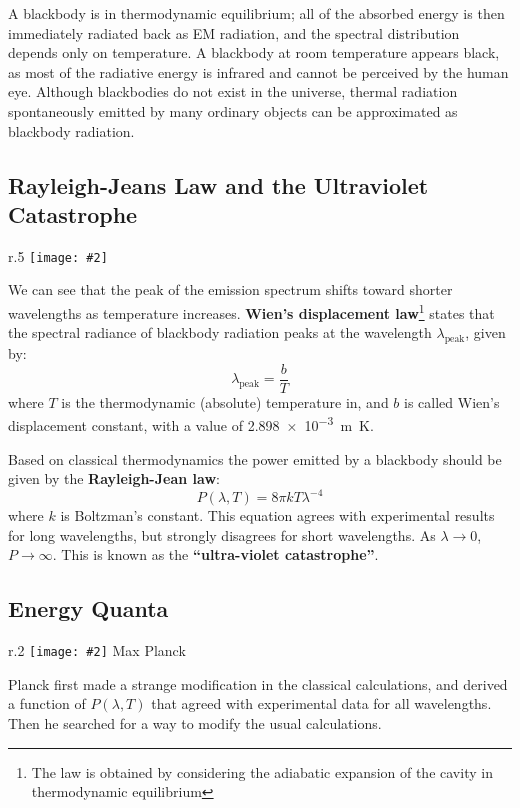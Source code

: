 \documentclass[11pt]{article}
\newcommand{\pic}[2]{\texttt{[image: \#2]}}
\begin{document}
A blackbody is in thermodynamic equilibrium; all of the absorbed energy is then
immediately radiated back as EM radiation, and the spectral distribution
depends only on temperature. A blackbody at room temperature appears black, as
most of the radiative energy is infrared and cannot be perceived by the human
eye. Although blackbodies do not exist in the universe, thermal radiation
spontaneously emitted by many ordinary objects can be approximated as blackbody
radiation.



\subsection{Rayleigh-Jeans Law and the Ultraviolet Catastrophe}

\begin{wrapfigure}{r}{.5\textwidth}
  \centering
  \pic{.5}{../1280px-Black_body}
\end{wrapfigure}
We can see that the peak of the emission spectrum shifts toward shorter
wavelengths as temperature increases.
\textbf{Wien's displacement law}\footnote{The law is obtained by
  considering the adiabatic expansion of the cavity in thermodynamic
  equilibrium} states that the spectral radiance of blackbody radiation peaks
at the wavelength $\lambda_{\text{peak}}$, given by:
\begin{equation}
  \lambda _{\text{peak}}=\frac {b}{T}
\end{equation}
where $T$ is the thermodynamic (absolute) temperature in, and $b$ is called
Wien's displacement constant, with a value of \SI{2.898e-3}{\metre\kelvin}.

Based on classical thermodynamics the power emitted by a blackbody should be
given by the \textbf{Rayleigh-Jean law}:
\begin{equation}
  P(\lambda,T)=8\pi kT\lambda^{-4}
\end{equation}
where $k$ is Boltzman's constant. This equation agrees with experimental
results for long wavelengths, but strongly disagrees for short wavelengths. As
$\lambda\rightarrow 0$, $P\rightarrow\infty$. This is known as the
\textbf{``ultra-violet catastrophe''}.

\subsection{Energy Quanta}

\begin{wrapfigure}{r}{.2\textwidth}
  \centering
  \pic{.2}{../20973-050-F6EEBFF1.jpg}
  Max Planck
\end{wrapfigure}
Planck first made a strange modification in the classical calculations, and
derived a function of $P(\lambda,T)$ that agreed with experimental data for all
wavelengths. 
Then he searched for a way to modify the usual calculations.
\end{document}
